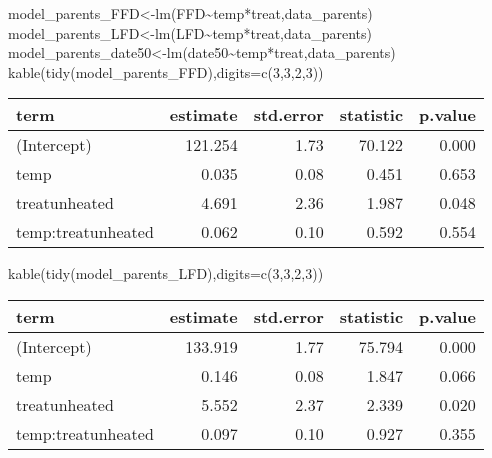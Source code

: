 \documentclass[
]{article}
\newenvironment{Shaded}{\begin{snugshade}}{\end{snugshade}}
\newcommand{\AttributeTok}[1]{\textcolor[rgb]{0.77,0.63,0.00}{#1}}
\newcommand{\DecValTok}[1]{\textcolor[rgb]{0.00,0.00,0.81}{#1}}
\newcommand{\FunctionTok}[1]{\textcolor[rgb]{0.00,0.00,0.00}{#1}}
\newcommand{\NormalTok}[1]{#1}
\newcommand{\OtherTok}[1]{\textcolor[rgb]{0.56,0.35,0.01}{#1}}
\newcommand{\SpecialCharTok}[1]{\textcolor[rgb]{0.00,0.00,0.00}{#1}}
\begin{document}
\begin{Shaded}
\begin{Highlighting}[]
\NormalTok{model\_parents\_FFD}\OtherTok{\textless{}{-}}\FunctionTok{lm}\NormalTok{(FFD}\SpecialCharTok{\textasciitilde{}}\NormalTok{temp}\SpecialCharTok{*}\NormalTok{treat,data\_parents)}
\NormalTok{model\_parents\_LFD}\OtherTok{\textless{}{-}}\FunctionTok{lm}\NormalTok{(LFD}\SpecialCharTok{\textasciitilde{}}\NormalTok{temp}\SpecialCharTok{*}\NormalTok{treat,data\_parents)}
\NormalTok{model\_parents\_date50}\OtherTok{\textless{}{-}}\FunctionTok{lm}\NormalTok{(date50}\SpecialCharTok{\textasciitilde{}}\NormalTok{temp}\SpecialCharTok{*}\NormalTok{treat,data\_parents)}
\FunctionTok{kable}\NormalTok{(}\FunctionTok{tidy}\NormalTok{(model\_parents\_FFD),}\AttributeTok{digits=}\FunctionTok{c}\NormalTok{(}\DecValTok{3}\NormalTok{,}\DecValTok{3}\NormalTok{,}\DecValTok{2}\NormalTok{,}\DecValTok{3}\NormalTok{))}
\end{Highlighting}
\end{Shaded}

\begin{longtable}[]{@{}lrrrr@{}}
\toprule()
term & estimate & std.error & statistic & p.value \\
\midrule()
\endhead
(Intercept) & 121.254 & 1.73 & 70.122 & 0.000 \\
temp & 0.035 & 0.08 & 0.451 & 0.653 \\
treatunheated & 4.691 & 2.36 & 1.987 & 0.048 \\
temp:treatunheated & 0.062 & 0.10 & 0.592 & 0.554 \\
\bottomrule()
\end{longtable}

\begin{Shaded}
\begin{Highlighting}[]
\FunctionTok{kable}\NormalTok{(}\FunctionTok{tidy}\NormalTok{(model\_parents\_LFD),}\AttributeTok{digits=}\FunctionTok{c}\NormalTok{(}\DecValTok{3}\NormalTok{,}\DecValTok{3}\NormalTok{,}\DecValTok{2}\NormalTok{,}\DecValTok{3}\NormalTok{))}
\end{Highlighting}
\end{Shaded}

\begin{longtable}[]{@{}lrrrr@{}}
\toprule()
term & estimate & std.error & statistic & p.value \\
\midrule()
\endhead
(Intercept) & 133.919 & 1.77 & 75.794 & 0.000 \\
temp & 0.146 & 0.08 & 1.847 & 0.066 \\
treatunheated & 5.552 & 2.37 & 2.339 & 0.020 \\
temp:treatunheated & 0.097 & 0.10 & 0.927 & 0.355 \\
\bottomrule()
\end{longtable}
\end{document}
